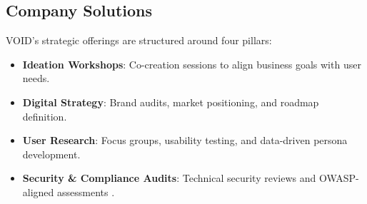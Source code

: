 

\subsection{Company Solutions}
\noindent
VOID's strategic offerings are structured around four pillars:

\begin{itemize}
  \item \textbf{Ideation Workshops}: Co-creation sessions to align business goals with user needs.  
  \item \textbf{Digital Strategy}: Brand audits, market positioning, and roadmap definition.  
  \item \textbf{User Research}: Focus groups, usability testing, and data-driven persona development.  
  \item \textbf{Security \& Compliance Audits}: Technical security reviews and OWASP-aligned assessments \cite{owasp2025}.  
\end{itemize}

\bigskip

